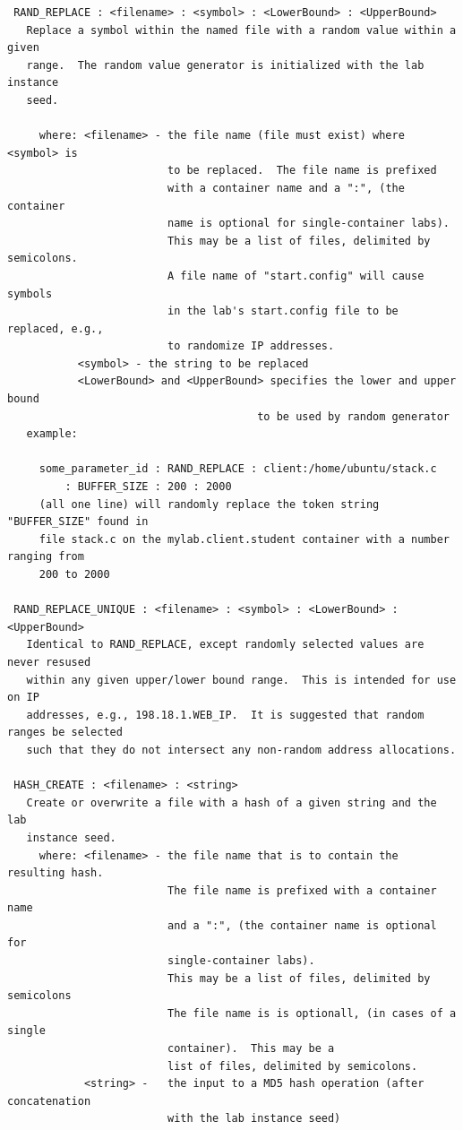 \documentclass[12pt]{article}
\begin{document}
\begin{verbatim}
 RAND_REPLACE : <filename> : <symbol> : <LowerBound> : <UpperBound>
   Replace a symbol within the named file with a random value within a given
   range.  The random value generator is initialized with the lab instance
   seed.

     where: <filename> - the file name (file must exist) where <symbol> is 
                         to be replaced.  The file name is prefixed 
                         with a container name and a ":", (the container 
                         name is optional for single-container labs).  
                         This may be a list of files, delimited by semicolons. 
                         A file name of "start.config" will cause symbols
                         in the lab's start.config file to be replaced, e.g.,
                         to randomize IP addresses.
           <symbol> - the string to be replaced
           <LowerBound> and <UpperBound> specifies the lower and upper bound
                                       to be used by random generator
   example:

     some_parameter_id : RAND_REPLACE : client:/home/ubuntu/stack.c 
         : BUFFER_SIZE : 200 : 2000
     (all one line) will randomly replace the token string "BUFFER_SIZE" found in
     file stack.c on the mylab.client.student container with a number ranging from 
     200 to 2000

 RAND_REPLACE_UNIQUE : <filename> : <symbol> : <LowerBound> : <UpperBound>
   Identical to RAND_REPLACE, except randomly selected values are never resused
   within any given upper/lower bound range.  This is intended for use on IP
   addresses, e.g., 198.18.1.WEB_IP.  It is suggested that random ranges be selected
   such that they do not intersect any non-random address allocations.
 
 HASH_CREATE : <filename> : <string>
   Create or overwrite a file with a hash of a given string and the lab 
   instance seed.
     where: <filename> - the file name that is to contain the resulting hash.
                         The file name is prefixed with a container name 
                         and a ":", (the container name is optional for 
                         single-container labs).  
                         This may be a list of files, delimited by semicolons 
                         The file name is is optionall, (in cases of a single
                         container).  This may be a 
                         list of files, delimited by semicolons.
            <string> -   the input to a MD5 hash operation (after concatenation 
                         with the lab instance seed)
                       

\end{verbatim}
\end{document}
